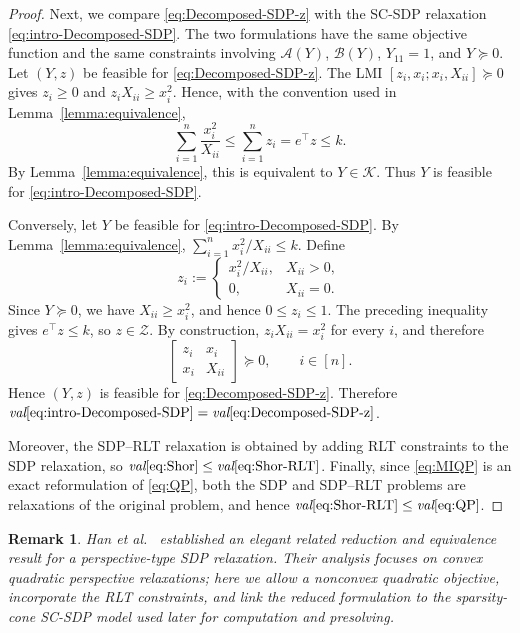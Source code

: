 \documentclass[11pt]{article}
\def\A{\mathcal{A}}
\def\B{\mathcal{B}}
\def\K{\mathcal{K}}
\theoremstyle{plain}
\newtheorem{remark}{Remark}
\begin{document}
\begin{proof}
Next, we compare \eqref{eq:Decomposed-SDP-z} with the SC-SDP relaxation \eqref{eq:intro-Decomposed-SDP}. The two formulations have the same objective function and the same constraints involving $\A(Y)$, $\B(Y)$, $Y_{11}=1$, and $Y\succeq0$. Let $(Y,z)$ be feasible for \eqref{eq:Decomposed-SDP-z}. The LMI $[z_i,x_i;x_i,X_{ii}]\succeq0$ gives $z_i\ge0$ and $z_iX_{ii}\ge x_i^2$. Hence, with the convention used in Lemma~\ref{lemma:equivalence},
\[
\sum_{i=1}^n \frac{x_i^2}{X_{ii}}
\le
\sum_{i=1}^n z_i
=e^\top z
\le k .
\]
By Lemma~\ref{lemma:equivalence}, this is equivalent to $Y\in\K$. Thus $Y$ is feasible for \eqref{eq:intro-Decomposed-SDP}.

Conversely, let $Y$ be feasible for \eqref{eq:intro-Decomposed-SDP}. By Lemma~\ref{lemma:equivalence}, $\sum_{i=1}^n x_i^2/X_{ii}\le k$.
Define
\[
z_i:=
\begin{cases}
x_i^2/X_{ii}, & X_{ii}>0,\\
0, & X_{ii}=0.
\end{cases}
\]
Since $Y\succeq0$, we have $X_{ii}\ge x_i^2$, and hence $0\le z_i\le1$. The preceding inequality gives $e^\top z\le k$, so $z\in\mathcal Z$. By construction, $z_iX_{ii}=x_i^2$ for every $i$, and therefore
\[
\begin{bmatrix}
z_i&x_i\\
x_i&X_{ii}
\end{bmatrix}
\succeq0,\qquad i\in[n].
\]
Hence $(Y,z)$ is feasible for \eqref{eq:Decomposed-SDP-z}. Therefore $\emph{val} \eqref{eq:intro-Decomposed-SDP}=\emph{val} \eqref{eq:Decomposed-SDP-z}$.

Moreover, the SDP--RLT relaxation is obtained by adding RLT constraints to the SDP relaxation, so $\emph{val} \eqref{eq:Shor}\le \emph{val} \eqref{eq:Shor-RLT}$. Finally, since \eqref{eq:MIQP} is an exact reformulation of \eqref{eq:QP}, both the SDP and SDP--RLT problems are relaxations of the original problem, and hence $\emph{val} \eqref{eq:Shor-RLT}\le \emph{val} \eqref{eq:QP}$.
\end{proof}



\begin{remark}
    Han et al.~\cite{han2022equivalence} established an elegant related reduction and equivalence result for a perspective-type SDP relaxation. Their analysis focuses on convex quadratic perspective relaxations; here we allow a nonconvex quadratic objective, incorporate the RLT constraints, and link the reduced formulation to the sparsity-cone SC-SDP model used later for computation and presolving.
\end{remark}
\end{document}

